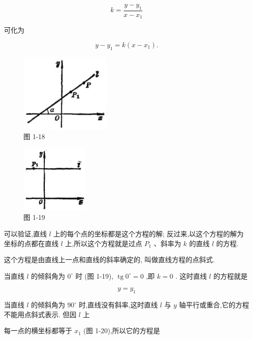 \documentclass[lang=cn,newtx,10pt,scheme=chinese]{elegantbook}
\begin{document}
\[
  k = \frac{y - {y}_{1}}{x - {x}_{1}}
\]

可化为

\[
  y - {y}_{1} = k\left( {x - {x}_{1}}\right) .
\]

\begin{figure}[h]
  \centering
  \includegraphics[max width=0.4\textwidth]{images/01912cc2-ffb6-728e-9ae7-b113ff05c64b_23_507928.jpg}
  \caption{图 1-18}
\end{figure}



\begin{figure}[h]
  \centering
  \includegraphics[max width=0.3\textwidth]{images/01912cc2-ffb6-728e-9ae7-b113ff05c64b_23_669751.jpg}
  \caption{图 1-19}
\end{figure}



可以验证,直线 \(l\) 上的每个点的坐标都是这个方程的解; 反过来,以这个方程的解为坐标的点都在直线 \(l\) 上,所以这个方程就是过点 \({P}_{1}\) 、斜率为 \(k\) 的直线 \(l\) 的方程.

这个方程是由直线上一点和直线的斜率确定的, 叫做直线方程的点斜式.

当直线 \(l\) 的倾斜角为 \({0}^{ \circ }\) 时 (图 1-19), \(\operatorname{tg}{0}^{ \circ } = 0\) ,即 \(k = 0\) . 这时直线 \(l\) 的方程就是

\[
  y = {y}_{1}
\]

当直线 \(l\) 的倾斜角为 \({90}^{ \circ }\) 时,直线没有斜率,这时直线 \(l\) 与 \(y\) 轴平行或重合,它的方程不能用点斜式表示. 但因 \(l\) 上

每一点的横坐标都等于 \({x}_{1}\) (图 1-20),所以它的方程是
\end{document}
